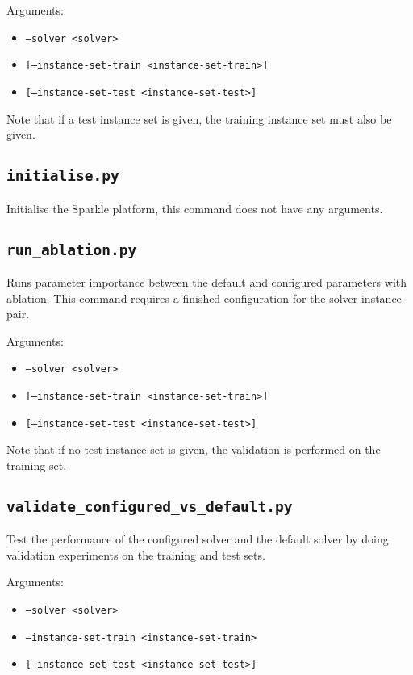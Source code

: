 \documentclass{article}
\begin{document}
Arguments:
\begin{itemize}[noitemsep]
  \item[] \texttt{--solver <solver>}
  \item[] \texttt{[--instance-set-train <instance-set-train>]}
  \item[] \texttt{[--instance-set-test <instance-set-test>]}
\end{itemize}

Note that if a test instance set is given, the training instance set must also be given.

\subsection{\texttt{initialise.py}}
\label{cmd:initialise}

Initialise the Sparkle platform, this command does not have any arguments.

\subsection{\texttt{run\_ablation.py}}
\label{cmd:run_ablation}
Runs parameter importance between the default and configured parameters with ablation. This command requires a finished configuration for the solver instance pair.

Arguments:
\begin{itemize}[noitemsep]
  \item[] \texttt{--solver <solver>}
  \item[] \texttt{[--instance-set-train <instance-set-train>]}
  \item[] \texttt{[--instance-set-test <instance-set-test>]}
\end{itemize}

Note that if no test instance set is given, the validation is performed on the training set.


\subsection{\texttt{validate\_configured\_vs\_default.py}}
\label{cmd:validate_configured_vs_default}
Test the performance of the configured solver and the default solver by doing validation experiments on the training and test sets.

Arguments:
\begin{itemize}[noitemsep]
  \item[] \texttt{--solver <solver>}
  \item[] \texttt{--instance-set-train <instance-set-train>}
  \item[] \texttt{[--instance-set-test <instance-set-test>]}
\end{itemize}
\end{document}
